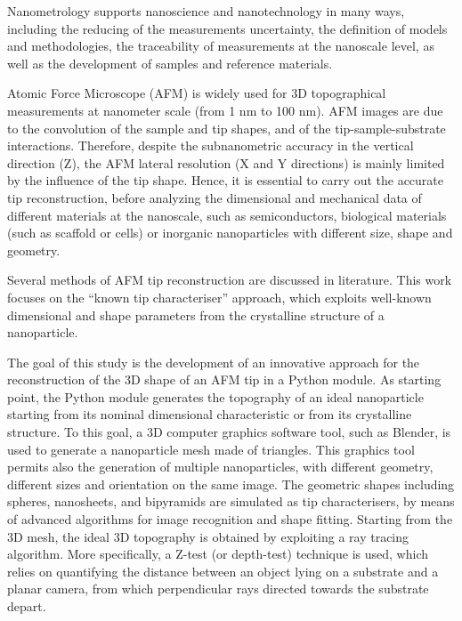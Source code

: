 \documentclass[12pt]{report} %
\begin{document}


\setcounter{page}{0}
\newpage

\noindent Nanometrology supports nanoscience and nanotechnology in many ways, including the reducing of the measurements uncertainty, the definition of models and methodologies, the traceability of measurements at the nanoscale level, as well as the development of samples and reference materials.

Atomic Force Microscope (AFM) is widely used for 3D topographical measurements at nanometer scale (from 1 nm to 100 nm). AFM images are due to the convolution of the sample and tip shapes, and of the tip-sample-substrate interactions. Therefore, despite the subnanometric accuracy in the vertical direction (Z), the AFM lateral resolution (X and Y directions) is mainly limited by the influence of the tip shape. Hence, it is essential to carry out the accurate tip reconstruction, before analyzing the dimensional and mechanical data of different materials at the nanoscale, such as semiconductors, biological materials (such as scaffold or cells) or inorganic nanoparticles with different size, shape and geometry.

Several methods of AFM tip reconstruction are discussed in literature. This work focuses on the “known tip characteriser” approach, which exploits well-known dimensional and shape parameters from the crystalline structure of a nanoparticle. 

The goal of this study is the development of an innovative approach for the reconstruction of the 3D shape of an AFM tip in a Python module. As starting point, the Python module generates the topography of an ideal nanoparticle starting from its nominal dimensional characteristic or from its crystalline structure. To this goal, a 3D computer graphics software tool, such as Blender, is used to generate a nanoparticle mesh made of triangles. This graphics tool permits also the generation of multiple nanoparticles, with different geometry, different sizes and orientation on the same image. The geometric shapes including spheres, nanosheets, and bipyramids are simulated as tip characterisers, by means of advanced algorithms for image recognition and shape fitting. Starting from the 3D mesh, the ideal 3D topography is obtained by exploiting a ray tracing algorithm. More specifically, a Z-test (or depth-test) technique is used, which relies on quantifying the distance between an object lying on a substrate and a planar camera, from which perpendicular rays directed towards the substrate depart. 
\end{document}
